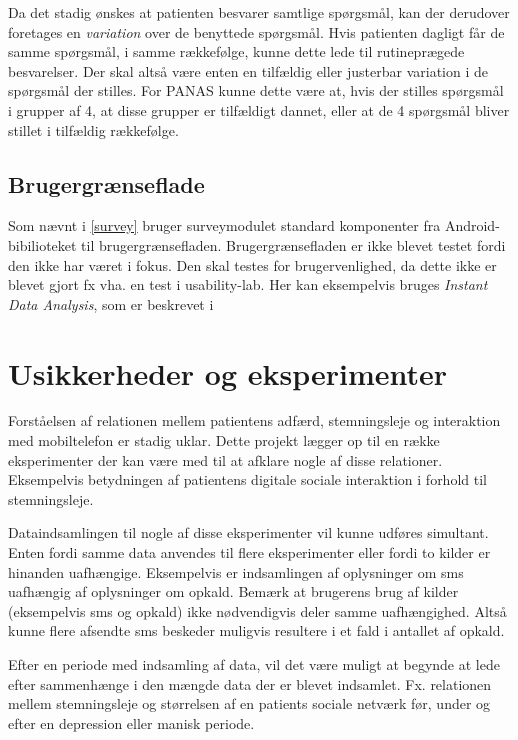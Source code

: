 Da det stadig ønskes at patienten besvarer samtlige spørgsmål, kan der derudover foretages en \emph{variation} over de benyttede spørgsmål.
Hvis patienten dagligt får de samme spørgsmål, i samme rækkefølge, kunne dette lede til rutineprægede besvarelser.
Der skal altså være enten en tilfældig eller justerbar variation i de spørgsmål der stilles.
For PANAS kunne dette være at, hvis der stilles spørgsmål i grupper af 4, at disse grupper er tilfældigt dannet, eller at de 4 spørgsmål bliver stillet i tilfældig rækkefølge.

\subsection{Brugergrænseflade}
Som nævnt i \cref{survey} bruger surveymodulet standard komponenter fra Android-bibilioteket til brugergrænsefladen.
Brugergrænsefladen er ikke blevet testet fordi den ikke har været i fokus.
Den skal testes for brugervenlighed, da dette ikke er blevet gjort fx vha. en test i usability-lab.
Her kan eksempelvis bruges \emph{Instant Data Analysis}, som er beskrevet i \citet{IDA}


\section{Usikkerheder og eksperimenter}\label{refleksion:usikkerhed}
Forståelsen af relationen mellem patientens adfærd, stemningsleje og interaktion med mobiltelefon er stadig uklar.
Dette projekt lægger op til en række eksperimenter der kan være med til at afklare nogle af disse relationer.
Eksempelvis betydningen af patientens digitale sociale interaktion i forhold til stemningsleje.

Dataindsamlingen til nogle af disse eksperimenter vil kunne udføres simultant.
Enten fordi samme data anvendes til flere eksperimenter eller fordi to kilder er hinanden uafhængige.
Eksempelvis er indsamlingen af oplysninger om sms uafhængig af oplysninger om opkald.
Bemærk at brugerens brug af kilder (eksempelvis sms og opkald) ikke nødvendigvis deler samme uafhængighed.
Altså kunne flere afsendte sms beskeder muligvis resultere i et fald i antallet af opkald.

Efter en periode med indsamling af data, vil det være muligt at begynde at lede efter sammenhænge i den mængde data der er blevet indsamlet.
Fx. relationen mellem stemningsleje og størrelsen af en patients sociale netværk før, under og efter en depression eller manisk periode.

